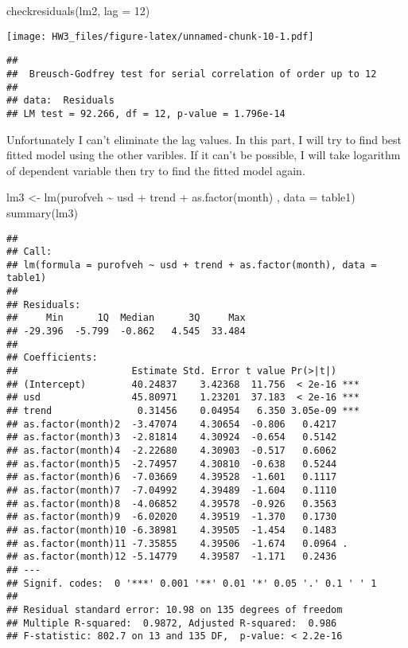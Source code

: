 \documentclass[
]{article}
\newenvironment{Shaded}{\begin{snugshade}}{\end{snugshade}}
\newcommand{\AttributeTok}[1]{\textcolor[rgb]{0.77,0.63,0.00}{#1}}
\newcommand{\DecValTok}[1]{\textcolor[rgb]{0.00,0.00,0.81}{#1}}
\newcommand{\FunctionTok}[1]{\textcolor[rgb]{0.00,0.00,0.00}{#1}}
\newcommand{\NormalTok}[1]{#1}
\newcommand{\OtherTok}[1]{\textcolor[rgb]{0.56,0.35,0.01}{#1}}
\newcommand{\SpecialCharTok}[1]{\textcolor[rgb]{0.00,0.00,0.00}{#1}}
\begin{document}
\begin{Shaded}
\begin{Highlighting}[]
\FunctionTok{checkresiduals}\NormalTok{(lm2, }\AttributeTok{lag =} \DecValTok{12}\NormalTok{)}
\end{Highlighting}
\end{Shaded}

\texttt{[image: HW3\_files/figure-latex/unnamed-chunk-10-1.pdf]}

\begin{verbatim}
## 
##  Breusch-Godfrey test for serial correlation of order up to 12
## 
## data:  Residuals
## LM test = 92.266, df = 12, p-value = 1.796e-14
\end{verbatim}

Unfortunately I can't eliminate the lag values. In this part, I will try
to find best fitted model using the other varibles. If it can't be
possible, I will take logarithm of dependent variable then try to find
the fitted model again.

\begin{Shaded}
\begin{Highlighting}[]
\NormalTok{lm3 }\OtherTok{\textless{}{-}} \FunctionTok{lm}\NormalTok{(purofveh }\SpecialCharTok{\textasciitilde{}}\NormalTok{ usd }\SpecialCharTok{+}\NormalTok{ trend }\SpecialCharTok{+} \FunctionTok{as.factor}\NormalTok{(month) , }\AttributeTok{data =}\NormalTok{ table1)}
\FunctionTok{summary}\NormalTok{(lm3)}
\end{Highlighting}
\end{Shaded}

\begin{verbatim}
## 
## Call:
## lm(formula = purofveh ~ usd + trend + as.factor(month), data = table1)
## 
## Residuals:
##     Min      1Q  Median      3Q     Max 
## -29.396  -5.799  -0.862   4.545  33.484 
## 
## Coefficients:
##                    Estimate Std. Error t value Pr(>|t|)    
## (Intercept)        40.24837    3.42368  11.756  < 2e-16 ***
## usd                45.80971    1.23201  37.183  < 2e-16 ***
## trend               0.31456    0.04954   6.350 3.05e-09 ***
## as.factor(month)2  -3.47074    4.30654  -0.806   0.4217    
## as.factor(month)3  -2.81814    4.30924  -0.654   0.5142    
## as.factor(month)4  -2.22680    4.30903  -0.517   0.6062    
## as.factor(month)5  -2.74957    4.30810  -0.638   0.5244    
## as.factor(month)6  -7.03669    4.39528  -1.601   0.1117    
## as.factor(month)7  -7.04992    4.39489  -1.604   0.1110    
## as.factor(month)8  -4.06852    4.39578  -0.926   0.3563    
## as.factor(month)9  -6.02020    4.39519  -1.370   0.1730    
## as.factor(month)10 -6.38981    4.39505  -1.454   0.1483    
## as.factor(month)11 -7.35855    4.39506  -1.674   0.0964 .  
## as.factor(month)12 -5.14779    4.39587  -1.171   0.2436    
## ---
## Signif. codes:  0 '***' 0.001 '**' 0.01 '*' 0.05 '.' 0.1 ' ' 1
## 
## Residual standard error: 10.98 on 135 degrees of freedom
## Multiple R-squared:  0.9872, Adjusted R-squared:  0.986 
## F-statistic: 802.7 on 13 and 135 DF,  p-value: < 2.2e-16
\end{verbatim}
\end{document}

